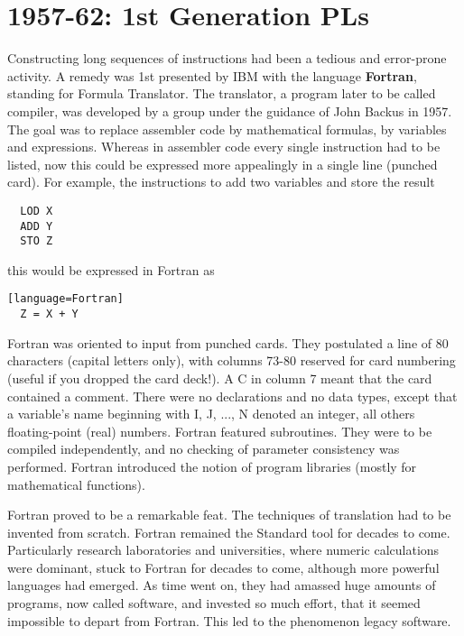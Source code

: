 \section{1957-62: 1st Generation PLs}
Constructing long sequences of instructions had been a tedious and error-prone
activity. A remedy was 1st presented by IBM with the language \textbf{Fortran},
standing for Formula Translator. The translator, a program later to be called
compiler, was developed by a group under the guidance of John Backus in 1957.
The goal was to replace assembler code by mathematical formulas, by variables
and expressions. Whereas in assembler code every single instruction had to be
listed, now this could be expressed more appealingly in a single line (punched
card). For example, the instructions to add two variables and store the result
\begin{verbatim}
  LOD X
  ADD Y
  STO Z
\end{verbatim}
this would be expressed in Fortran as
\begin{verbatim}[language=Fortran]
  Z = X + Y
\end{verbatim}
Fortran was oriented to input from punched cards. They postulated a line of 80
characters (capital letters only), with columns 73-80 reserved for card numbering
(useful if you dropped the card deck!). A C in column 7 meant that the card
contained a comment. There were no declarations and no data types, except that a
variable’s name beginning with I, J, ..., N denoted an integer, all others
floating-point (real) numbers. Fortran featured subroutines. They were to be compiled
independently, and no checking of parameter consistency was performed. Fortran
introduced the notion of program libraries (mostly for mathematical functions).

Fortran proved to be a remarkable feat. The techniques of translation had to be
invented from scratch. Fortran remained the Standard tool for decades to come.
Particularly research laboratories and universities, where numeric calculations
were dominant, stuck to Fortran for decades to come, although more powerful
languages had emerged. As time went on, they had amassed huge amounts of
programs, now called software, and invested so much effort, that it seemed
impossible to depart from Fortran. This led to the phenomenon legacy software.

